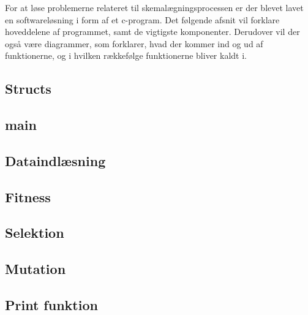 
For at løse problemerne relateret til skemalægningsprocessen er der blevet lavet en softwareløsning i form af et c-program. Det følgende afsnit vil forklare hoveddelene af programmet, samt de vigtigste komponenter. Derudover vil der også være diagrammer, som forklarer, hvad der kommer ind og ud af funktionerne, og i hvilken rækkefølge funktionerne bliver kaldt i.

\subsection{Structs}
  

\subsection{main}
  

\subsection{Dataindlæsning}
  

\subsection{Fitness}
  

\subsection{Selektion}
  

\subsection{Mutation}
  

\subsection{Print funktion}
  
